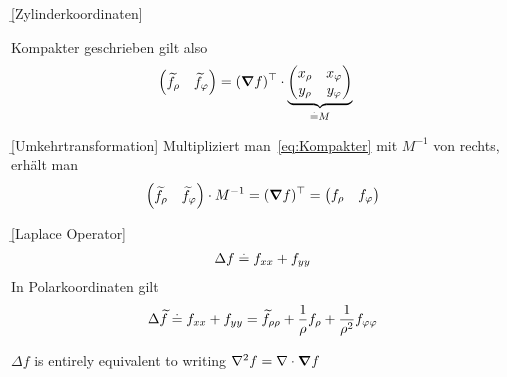 \documentclass[12pt]{article}
\begin{document}
\begin{defn}{\b{[Zylinderkoordinaten]}}
\begin{thmb}
        Kompakter geschrieben gilt also
        \begin{align}
            \begin{pmatrix}\widetilde{f}_\rho & \widetilde{f}_\varphi\end{pmatrix} & =(\grad{f})^\top\cdot\underbrace{\begin{pmatrix}                                                                     x_\rho & x_\varphi \\
                                                                                    y_\rho & y_\varphi
                                                                                                                          \end{pmatrix}}_{\defeq M}\label{eq:Kompakter}
        \end{align}
    \end{thmb}
\end{defn}\vspace*{1em}

\begin{defn}{\b{[Umkehrtransformation]}}
    Multipliziert man~\eqref{eq:Kompakter} mit $M^{-1}$ von rechts, erhält man
    \begin{align}
        \begin{pmatrix}\widetilde{f}_\rho & \widetilde{f}_\varphi\end{pmatrix} \cdot M^{-1} = (\grad{f})^\top=\begin{pmatrix}
                                                                                                                  f_\rho & f_\varphi
                                                                                                              \end{pmatrix}
    \end{align}
\end{defn}

\begin{defn}{\b{[Laplace Operator]}}
    \begin{align}
        \Delta{f}\overset{.}{=} f_{xx}+f_{yy}
    \end{align}
    In Polarkoordinaten gilt
    \begin{align}
        \Delta\widetilde{f}\overset{.}{=}{f}_{xx}+f_{yy}=\widetilde{f}_{\rho\rho}+\frac{1}{\rho}f_\rho+\frac{1}{\rho^2}f_{\varphi\varphi}
    \end{align}
\end{defn}

\begin{rmk}{}{}
    $\Delta f$ is entirely equivalent to writing $\nabla^2 f=\nabla\cdot\grad{f}$
\end{rmk}
\end{document}
